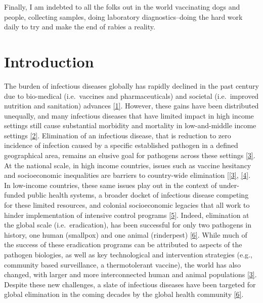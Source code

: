 \documentclass[
  oneside]{book}
\begin{document}
Finally, I am indebted to all the folks out in the world vaccinating dogs and people, collecting samples, doing laboratory diagnostics--doing the hard work daily to try and make the end of rabies a reality. 

{
\setcounter{tocdepth}{1}
\tableofcontents
}
\listoftables
\listoffigures
\mainmatter

\setlength{\headheight}{15pt}
\pagestyle{plain}

\setlength{\parskip}{2em}

\hypertarget{introduction}{%
\chapter{Introduction}\label{introduction}}

The burden of infectious diseases globally has rapidly declined in the past century due to bio-medical (i.e.~vaccines and pharmaceuticals) and societal (i.e.~improved nutrition and sanitation) advances \protect\hyperlink{ref-santosa2014}{{[}1{]}}. However, these gains have been distributed unequally, and many infectious diseases that have limited impact in high income settings still cause substantial morbidity and mortality in low-and-middle income settings \protect\hyperlink{ref-marinho2013}{{[}2{]}}. Elimination of an infectious disease, that is reduction to zero incidence of infection caused by a specific established pathogen in a defined geographical area, remains an elusive goal for pathogens across these settings \protect\hyperlink{ref-klepac2013}{{[}3{]}}. At the national scale, in high income countries, issues such as vaccine hesitancy and socioeconomic inequalities are barriers to country-wide elimination {[}\protect\hyperlink{ref-klepac2013}{{[}3{]}}, \protect\hyperlink{ref-hotez2008}{{[}4{]}}. In low-income countries, these same issues play out in the context of under-funded public health systems, a broader docket of infectious disease competing for these limited resources, and colonial socioeconomic legacies that all work to hinder implementation of intensive control programs \protect\hyperlink{ref-hotez2010}{{[}5{]}}. Indeed, elimination at the global scale (i.e.~eradication), has been successful for only two pathogens in history, one human (smallpox) and one animal (rinderpest) \protect\hyperlink{ref-klepac2015}{{[}6{]}}. While much of the success of these eradication programs can be attributed to aspects of the pathogen biologies, as well as key technological and intervention strategies (e.g., community based surveillance, a thermotolerant vaccine), the world has also changed, with larger and more interconnected human and animal populations \protect\hyperlink{ref-klepac2013}{{[}3{]}}. Despite these new challenges, a slate of infectious diseases have been targeted for global elimination in the coming decades by the global health community \protect\hyperlink{ref-klepac2015}{{[}6{]}}.
\end{document}
